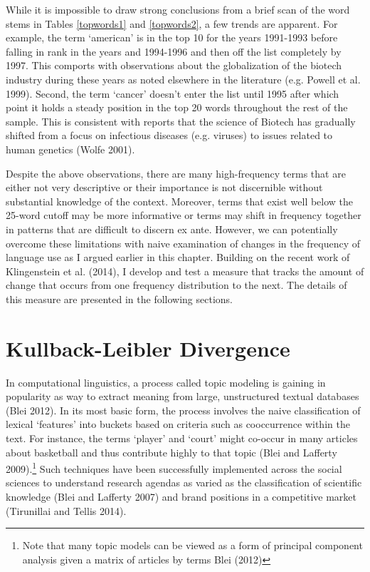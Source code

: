 While it is impossible to draw strong conclusions from a brief scan of the word stems in Tables \ref{topwords1} and \ref{topwords2}, a few trends are apparent. For example, the  term `american' is in the top 10 for the years 1991-1993 before falling in rank in the years and 1994-1996 and then off the list completely by 1997. This comports with observations about the globalization of the biotech industry during these years as noted elsewhere in the literature (e.g. Powell et al. 1999). Second, the term `cancer' doesn't enter the list until 1995 after which point it holds a steady position in the top 20 words throughout the rest of the sample. This is consistent with reports that the science of Biotech has gradually shifted from a focus on infectious diseases (e.g. viruses) to issues related to human genetics (Wolfe 2001).

Despite the above observations, there are many high-frequency terms that are either not very descriptive or their importance is not discernible without substantial knowledge of the context. Moreover, terms that exist well below the 25-word cutoff may be more informative or terms may shift in frequency together in patterns that are difficult to discern ex ante. However, we can potentially overcome these limitations with naive examination of changes in the frequency of language use as I argued earlier in this chapter. Building on the recent work of Klingenstein et al. (2014), I develop and test a measure that tracks the amount of change that occurs from one frequency distribution to the next. The details of this measure are presented in the following sections.

\section{Kullback-Leibler Divergence}

In computational linguistics, a process called topic modeling is gaining in popularity as way to extract meaning from large, unstructured textual databases (Blei 2012). In its most basic form, the process involves the naive classification of lexical `features' into buckets based on criteria such as cooccurrence within the text. For instance, the terms `player' and `court' might co-occur in many articles about basketball and thus contribute highly to that topic (Blei and Lafferty 2009).\footnote{Note that many topic models can be viewed as a form of principal component analysis given a matrix of articles by terms Blei (2012)} Such techniques have been successfully implemented across the social sciences to understand research agendas as varied as the classification of scientific knowledge (Blei and Lafferty 2007) and brand positions in a competitive market (Tirunillai and Tellis 2014).


